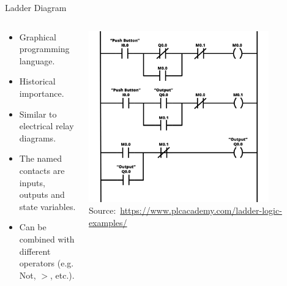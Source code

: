 \documentclass[18pt]{beamer}
\begin{document}
\begin{frame}{Ladder Diagram}
\begin{columns}
	\begin{column}{0.5\textwidth}
		\begin{itemize}
            \item Graphical programming language.
            \item Historical importance.
			\item Similar to electrical relay diagrams.
			\item The named contacts are inputs, outputs and state variables.
			\item Can be combined with different operators (e.g. Not, $ >$, etc.).
		\end{itemize}
	\end{column}
	\begin{column}{0.5\textwidth}
		\includegraphics[width=0.8\textwidth]{figures/ld.png}
       {\footnotesize  Source:~\url{https://www.plcacademy.com/ladder-logic-examples/}}
	\end{column}
\end{columns}
\end{frame}
\end{document}
